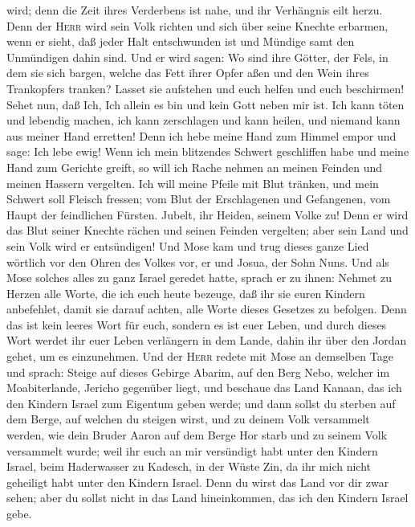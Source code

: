 wird; denn die Zeit ihres Verderbens ist nahe, und ihr Verhängnis eilt
herzu.  Denn der \textsc{Herr} wird sein Volk richten und
sich über seine Knechte erbarmen, wenn er sieht, daß jeder Halt
entschwunden ist und Mündige samt den Unmündigen dahin sind.
 Und er wird sagen: Wo sind ihre Götter, der Fels, in dem
sie sich bargen,  welche das Fett ihrer Opfer aßen und
den Wein ihres Trankopfers tranken? Lasset sie aufstehen und euch helfen
und euch beschirmen!  Sehet nun, daß Ich, Ich allein es
bin und kein Gott neben mir ist. Ich kann töten und lebendig machen, ich
kann zerschlagen und kann heilen, und niemand kann aus meiner Hand
erretten!  Denn ich hebe meine Hand zum Himmel empor und
sage: Ich lebe ewig!  Wenn ich mein blitzendes Schwert
geschliffen habe und meine Hand zum Gerichte greift, so will ich Rache
nehmen an meinen Feinden und meinen Hassern vergelten. 
Ich will meine Pfeile mit Blut tränken, und mein Schwert soll Fleisch
fressen; vom Blut der Erschlagenen und Gefangenen, vom Haupt der
feindlichen Fürsten.  Jubelt, ihr Heiden, seinem Volke
zu! Denn er wird das Blut seiner Knechte rächen und seinen Feinden
vergelten; aber sein Land und sein Volk wird er entsündigen!
 Und Mose kam und trug dieses ganze Lied wörtlich vor den
Ohren des Volkes vor, er und Josua, der Sohn Nuns.  Und
als Mose solches alles zu ganz Israel geredet hatte, sprach er zu ihnen:
 Nehmet zu Herzen alle Worte, die ich euch heute bezeuge,
daß ihr sie euren Kindern anbefehlet, damit sie darauf achten, alle
Worte dieses Gesetzes zu befolgen.  Denn das ist kein
leeres Wort für euch, sondern es ist euer Leben, und durch dieses Wort
werdet ihr euer Leben verlängern in dem Lande, dahin ihr über den Jordan
gehet, um es einzunehmen.  Und der \textsc{Herr} redete
mit Mose an demselben Tage und sprach:  Steige auf dieses
Gebirge Abarim, auf den Berg Nebo, welcher im Moabiterlande, Jericho
gegenüber liegt, und beschaue das Land Kanaan, das ich den Kindern
Israel zum Eigentum geben werde;  und dann sollst du
sterben auf dem Berge, auf welchen du steigen wirst, und zu deinem Volk
versammelt werden, wie dein Bruder Aaron auf dem Berge Hor starb und zu
seinem Volk versammelt wurde;  weil ihr euch an mir
versündigt habt unter den Kindern Israel, beim Haderwasser zu Kadesch,
in der Wüste Zin, da ihr mich nicht geheiligt habt unter den Kindern
Israel.  Denn du wirst das Land vor dir zwar sehen; aber
du sollst nicht in das Land hineinkommen, das ich den Kindern Israel
gebe.

